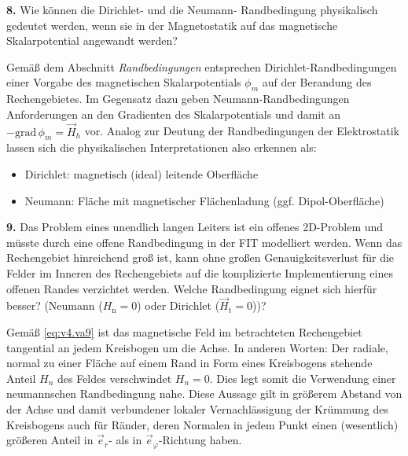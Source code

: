 \documentclass[./Protokollheft.tex]{subfiles}
\begin{document}
\begin{framed}
	\noindent \textbf{8.} Wie können die Dirichlet- und die Neumann- Randbedingung physikalisch gedeutet werden, wenn sie in der Magnetostatik auf das magnetische Skalarpotential angewandt werden?\label{exer:bndCondMagScalarPot}
\end{framed}

Gemäß dem Abschnitt \textit{Randbedingungen} entsprechen Dirichlet-Randbedingungen einer Vorgabe des magnetischen Skalarpotentials $\phi _m$ auf der Berandung des Rechengebietes. Im Gegensatz dazu geben Neumann-Randbedingungen Anforderungen an den Gradienten des Skalarpotentials und damit an $ {- \mathrm{grad}} \, \phi _m = \vec{H} _h $ vor.
Analog zur Deutung  der Randbedingungen der Elektrostatik lassen sich die physikalischen Interpretationen also erkennen als:
\begin{itemize}
	\item Dirichlet: magnetisch (ideal) leitende Oberfläche
	\item Neumann: Fläche mit magnetischer Flächenladung (ggf. Dipol-Oberfläche)
\end{itemize}


\begin{framed}
	\noindent \textbf{9.} Das Problem eines unendlich langen Leiters ist ein
offenes 2D-Problem und müsste durch eine offene
Randbedingung in der FIT modelliert werden. Wenn das
Rechengebiet hinreichend groß ist, kann ohne großen
Genauigkeitsverlust für die Felder im Inneren des Rechengebiets
auf die komplizierte Implementierung eines offenen Randes
verzichtet werden. Welche Randbedingung eignet sich hierfür besser? (Neumann ($H_{\text{n}}=0$) oder Dirichlet ($\vec{H}_{\text{t}}=0$))?\label{exer:boundCondInfiniteConductor}
\end{framed}

Gemäß \ref{eq:v4.va9} ist das magnetische Feld im betrachteten Rechengebiet tangential an jedem Kreisbogen um die Achse. In anderen Worten: Der radiale, normal zu einer Fläche auf einem Rand in Form eines Kreisbogens stehende Anteil $H_n$ des Feldes verschwindet $H_n = 0$.  Dies legt somit die Verwendung einer neumannschen Randbedingung nahe. Diese Aussage gilt in größerem Abstand von der Achse und damit verbundener lokaler Vernachlässigung der Krümmung des Kreisbogens auch für Ränder, deren Normalen in jedem Punkt einen (wesentlich) größeren Anteil in $\vec{e} _r$- als in $\vec{e} _\varphi$-Richtung haben.
\end{document}
